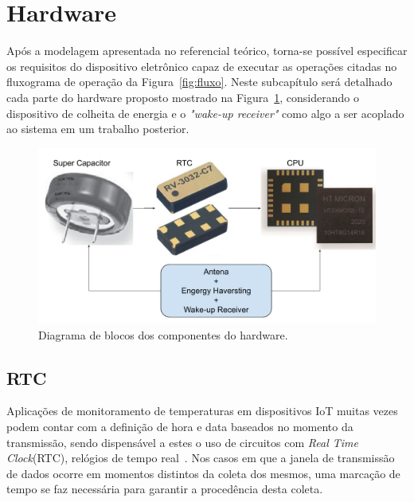 \section{Hardware}
Após a modelagem apresentada no referencial teórico, torna-se possível especificar os requisitos do dispositivo eletrônico capaz de executar as operações citadas no fluxograma de operação da Figura~\ref{fig:fluxo}. Neste subcapítulo será detalhado cada parte do hardware proposto mostrado na Figura~\ref{fig:sistema}, considerando o dispositivo de colheita de energia e o \textit{"wake-up receiver"} como algo a ser acoplado ao sistema em um trabalho posterior.

\begin{figure}[h!]
  \caption{Diagrama de blocos dos componentes do hardware.}
  \begin{center}
      \includegraphics[scale=0.7]{img/sistema.pdf}
  \end{center}
  \label{fig:sistema}
\end{figure}
\subsection{RTC}\label{sec:RTC}
Aplicações de monitoramento de temperaturas em dispositivos IoT muitas vezes podem contar com a definição de hora e data baseados no momento da transmissão, sendo dispensável a estes o uso de circuitos com \textit{Real Time Clock}(RTC), relógios de tempo real~\cite{Soh}. Nos casos em que a janela de transmissão de dados ocorre em momentos distintos da coleta dos mesmos, uma marcação de tempo se faz necessária para garantir a procedência desta coleta.

